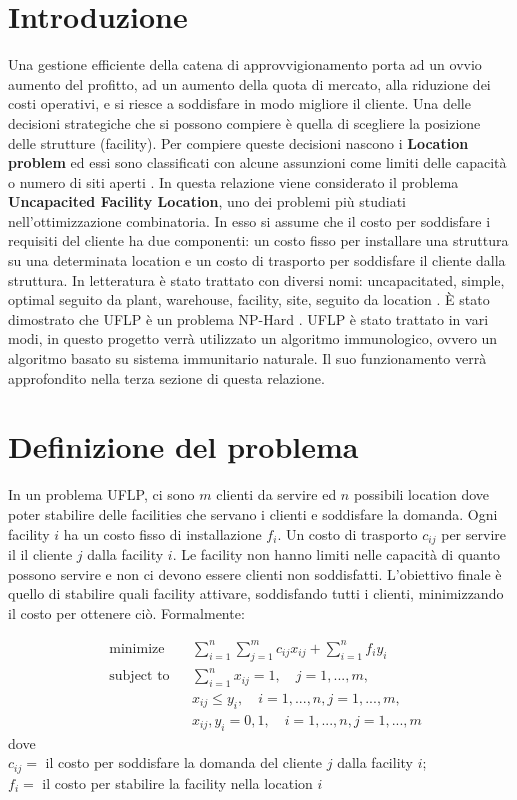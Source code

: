 \documentclass[a4paper,12pt,titlepage,oneside]{article}
\begin{document}
\section{Introduzione}
Una gestione efficiente della catena di approvvigionamento porta ad un ovvio aumento del profitto, ad un aumento della quota di mercato, alla riduzione dei costi operativi, e si riesce a soddisfare in modo migliore il cliente. Una delle decisioni strategiche che si possono compiere è quella di scegliere la posizione delle strutture (facility). Per compiere queste decisioni nascono i \textbf{Location problem} ed essi sono classificati con alcune assunzioni come limiti delle capacità o numero di siti aperti \cite{intro1}. In questa relazione viene considerato il problema \textbf{Uncapacited Facility Location}, uno dei problemi più studiati nell'ottimizzazione combinatoria. In esso si assume che il costo per soddisfare i requisiti del cliente ha due componenti: un costo fisso per installare una struttura su una determinata location e un costo di trasporto per soddisfare il cliente dalla struttura. In letteratura è stato trattato con diversi nomi: uncapacitated, simple, optimal seguito da plant, warehouse, facility, site, seguito da location \cite{intro2}. È stato dimostrato che UFLP è un problema NP-Hard \cite{npcit}. UFLP è stato trattato in vari modi, in questo progetto verrà utilizzato un algoritmo immunologico, ovvero un algoritmo basato su sistema immunitario naturale. Il suo funzionamento verrà approfondito nella terza sezione di questa relazione.  
\section{Definizione del problema}

In un problema UFLP, ci sono $m$ clienti da servire ed $n$ possibili location dove poter stabilire delle facilities che servano i clienti e soddisfare la domanda. Ogni facility $i$ ha un costo fisso di installazione $f_{i}$. Un costo di trasporto $c_{ij}$ per servire il il cliente $j$ dalla facility $i$. Le facility non hanno limiti nelle capacità di quanto possono servire e non ci devono essere clienti non soddisfatti. L'obiettivo finale è quello di stabilire quali facility attivare, soddisfando tutti i clienti, minimizzando il costo per ottenere ciò. Formalmente:

\begin{equation*}
\begin{aligned}
& \underset{}{\text{minimize}}
& & \sum_{i=1}^{n} \sum_{j=1}^{m}c_{ij}x_{ij} + \sum_{i=1}^{n}f_{i}y_{i} \\
& \text{subject to}
& & \sum_{i=1}^{n}x_{ij}=1, \quad j=1,...,m, \\
& & & x_{ij}\leq y_{i}, \quad i=1,...,n, j=1,...,m,\\
& & &  x_{ij},y_i=0,1,\quad i=1,...,n, j=1,...,m
\end{aligned}
\end{equation*}
dove \\
$c_{ij} =$ il costo per soddisfare la domanda del cliente $j$ dalla facility $i$; \\
$f_{i} =$ il costo per stabilire la facility nella location $i$ \\
\end{document}
